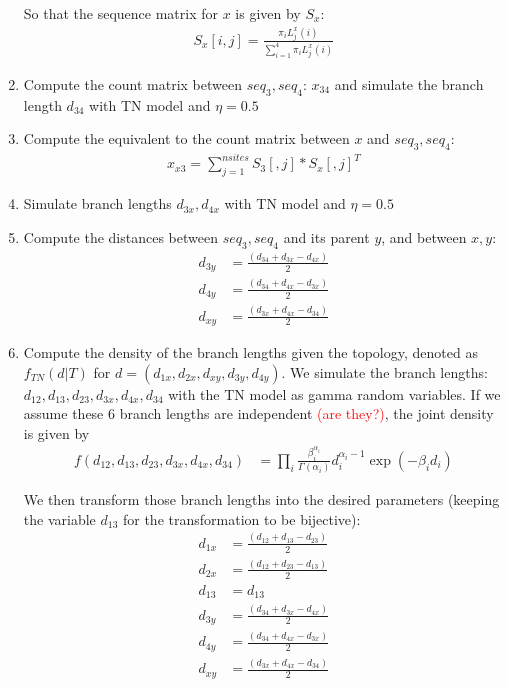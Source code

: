 \documentclass[12pt,letterpaper]{article}
\newcommand{\falta}[1]{\textcolor{red}{#1}}
\begin{document}
\begin{enumerate}
So that the sequence matrix for $x$ is given by $S_x$:
\begin{align*}
S_x[i,j] = \frac{\pi_i L^x_j(i)}{\sum_{i=1}^4 \pi_i L^x_j(i)}
\end{align*}

\item Compute the count matrix between $seq_3,seq_4$: $x_{34}$ and
  simulate the branch length $d_{34}$ with TN model and
  $\eta=0.5$
\item Compute the equivalent to the count matrix between $x$ and
  $seq_3,seq_4$:
\begin{align*}
x_{x3}=\sum_{j=1}^{nsites} S_3[,j]*S_x[,j]^T
\end{align*}
\item Simulate branch lengths $d_{3x}, d_{4x}$ with TN model
  and $\eta=0.5$
\item Compute the distances between $seq_3,seq_4$ and its parent $y$,
  and between $x,y$:
\begin{align*}
  d_{3y} &= \frac{(d_{34}+d_{3x}-d_{4x})}{2} \\
  d_{4y} &= \frac{(d_{34}+d_{4x}-d_{3x})}{2} \\
  d_{xy} &= \frac{(d_{3x}+d_{4x}-d_{34})}{2}
\end{align*}

\item Compute the density of the branch lengths given the topology,
  denoted as $f_{TN}(d|T)$ for
  $d=(d_{1x},d_{2x},d_{xy},d_{3y},d_{4y})$.  We simulate the branch
  lengths: $d_{12},d_{13},d_{23},d_{3x},d_{4x},d_{34}$ with the TN
  model as gamma random variables. If we assume these 6 branch lengths
  are independent \falta{(are they?)}, the joint density is given by
  \begin{align*}
    f(d_{12},d_{13},d_{23},d_{3x},d_{4x},d_{34}) &= \prod_{i}
    \frac{\beta_i^{\alpha_i}}{\Gamma(\alpha_i)} d_i^{\alpha_i-1} \exp{(-\beta_id_i)}
  \end{align*}

  We then transform those branch lengths into the desired parameters
  (keeping the variable $d_{13}$ for the transformation to be
  bijective):
  \begin{align*}
    d_{1x} &= \frac{(d_{12}+d_{13}-d_{23})}{2} \\
    d_{2x} &= \frac{(d_{12}+d_{23}-d_{13})}{2} \\
    d_{13} &= d_{13} \\
    d_{3y} &= \frac{(d_{34}+d_{3x}-d_{4x})}{2} \\
    d_{4y} &= \frac{(d_{34}+d_{4x}-d_{3x})}{2} \\
    d_{xy} &= \frac{(d_{3x}+d_{4x}-d_{34})}{2}
  \end{align*}


\end{enumerate}
\end{document}
